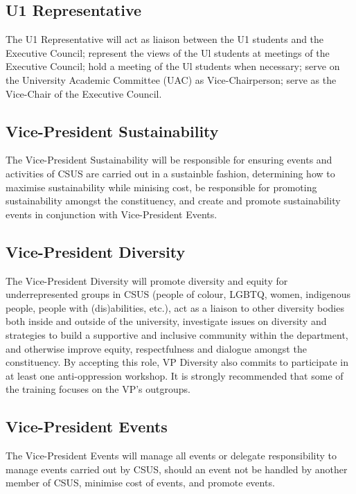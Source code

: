\subsection{U1 Representative}\label{u1-representative}

The U1 Representative will act as liaison between the U1 students and
the Executive Council; represent the views of the Ul students at
meetings of the Executive Council; hold a meeting of the Ul students
when necessary; serve on the University Academic Committee (UAC) as
Vice-Chairperson; serve as the Vice-Chair of the Executive Council.

\subsection{Vice-President
Sustainability}\label{vice-president-sustainability}

The Vice-President Sustainability will be responsible for ensuring
events and activities of CSUS are carried out in a sustainble fashion,
determining how to maximise sustainability while minising cost, be
responsible for promoting sustainability amongst the constituency, and
create and promote sustainability events in conjunction with
Vice-President Events.

\subsection{Vice-President Diversity}\label{vice-president-diversity}

The Vice-President Diversity will promote diversity and equity for 
underrepresented groups in CSUS (people of colour, LGBTQ, women,
 indigenous people, people with (dis)abilities, etc.), act as a liaison to other 
diversity bodies both inside and outside of the university, investigate issues 
on diversity and strategies to build a supportive and inclusive community 
within the department, and otherwise improve equity, respectfulness and 
dialogue amongst the constituency. By accepting this role, VP Diversity also 
commits to participate in at least one anti-oppression workshop. It is strongly 
recommended that some of the training focuses on the VP’s outgroups.


\subsection{Vice-President Events}\label{vice-president-events}

The Vice-President Events will manage all events or delegate
responsibility to manage events carried out by CSUS, should an event not
be handled by another member of CSUS, minimise cost of events, and
promote events.


